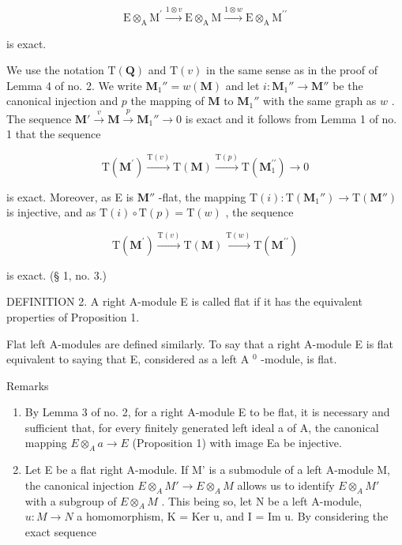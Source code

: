 \[
\mathrm{E} \otimes_ {\mathrm{A}} \mathrm{M} ^ {\prime} \xrightarrow {1 \otimes v} \mathrm{E} \otimes_ {\mathrm{A}} \mathrm{M} \xrightarrow {1 \otimes w} \mathrm{E} \otimes_ {\mathrm{A}} \mathrm{M} ^ {\prime \prime}
\]

is exact.

We use the notation \(\mathrm{T}(\mathbf{Q})\) and \(\mathrm{T}(v)\) in the same sense as in the proof of Lemma 4 of no. 2. We write \(\mathbf{M}_1'' = w(\mathbf{M})\) and let \(i: \mathbf{M}_1'' \to \mathbf{M}''\) be the canonical injection and \(p\) the mapping of \(\mathbf{M}\) to \(\mathbf{M}_1''\) with the same graph as \(w\) . The sequence \(\mathbf{M}' \xrightarrow{v} \mathbf{M} \xrightarrow{p} \mathbf{M}_1'' \to 0\) is exact and it follows from Lemma 1 of no. 1 that the sequence

\[
\mathrm{T} (\mathbf {M} ^ {\prime}) \xrightarrow {\mathrm{T} (v)} \mathrm{T} (\mathbf {M}) \xrightarrow {\mathrm{T} (p)} \mathrm{T} (\mathbf {M} _ {1} ^ {\prime \prime}) \longrightarrow 0
\]

is exact. Moreover, as E is \(\mathbf{M}''\) -flat, the mapping \(\mathrm{T}(i): \mathrm{T}(\mathbf{M}_1'') \to \mathrm{T}(\mathbf{M}'')\) is injective, and as \(\mathrm{T}(i) \circ \mathrm{T}(p) = \mathrm{T}(w)\) , the sequence

\[
\mathrm{T} (\mathbf {M} ^ {\prime}) \xrightarrow {\mathrm{T} (v)} \mathrm{T} (\mathbf {M}) \xrightarrow {\mathrm{T} (w)} \mathrm{T} (\mathbf {M} ^ {\prime \prime})
\]

is exact. (§ 1, no. 3.)

DEFINITION 2. A right A-module E is called flat if it has the equivalent properties of Proposition 1.

Flat left A-modules are defined similarly. To say that a right A-module E is flat equivalent to saying that E, considered as a left A \(^{0}\) -module, is flat.

Remarks

\begin{enumerate}
\def\labelenumi{(\arabic{enumi})}
\item
  By Lemma 3 of no. 2, for a right A-module E to be flat, it is necessary and sufficient that, for every finitely generated left ideal a of A, the canonical mapping \(E \otimes_{A} a \to E\) (Proposition 1) with image Ea be injective.
\item
  Let E be a flat right A-module. If M' is a submodule of a left A-module M, the canonical injection \(E \otimes_{A} M' \to E \otimes_{A} M\) allows us to identify \(E \otimes_{A} M'\) with a subgroup of \(E \otimes_{A} M\) . This being so, let N be a left A-module, \(u: M \to N\) a homomorphism, K = Ker u, and I = Im u. By considering the exact sequence
\end{enumerate}

